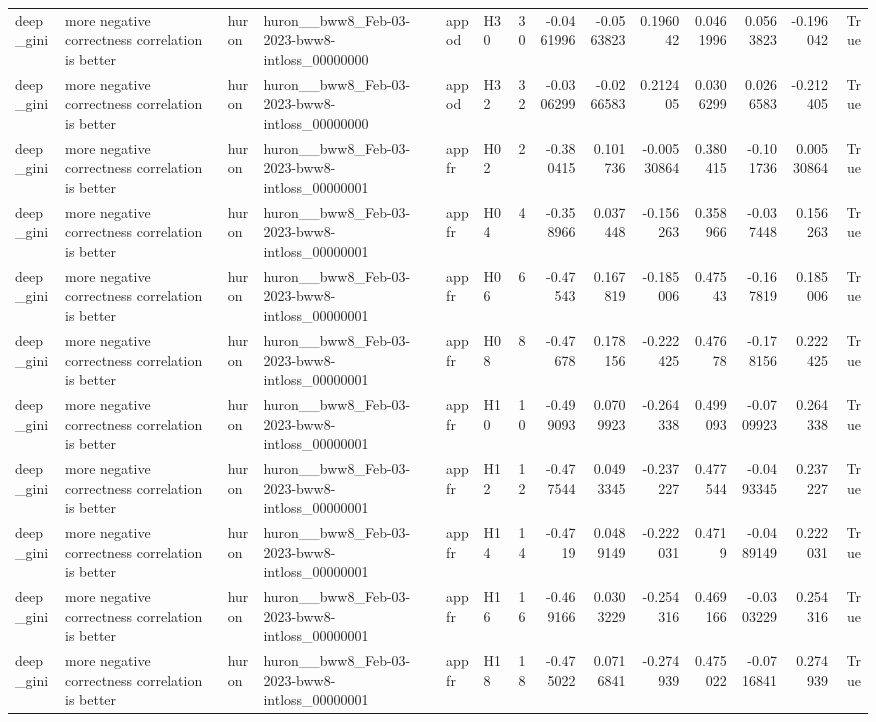 \begin{longtable}{llllllrrrrrrrr}
deep\_gini & more negative correctness correlation is better & huron & huron\_\_bww8\_Feb-03-2023-bww8-intloss\_00000000 & appod & H30 & 30 & -0.0461996 & -0.0563823 & 0.196042 & 0.0461996 & 0.0563823 & -0.196042 & True \\
deep\_gini & more negative correctness correlation is better & huron & huron\_\_bww8\_Feb-03-2023-bww8-intloss\_00000000 & appod & H32 & 32 & -0.0306299 & -0.0266583 & 0.212405 & 0.0306299 & 0.0266583 & -0.212405 & True \\
deep\_gini & more negative correctness correlation is better & huron & huron\_\_bww8\_Feb-03-2023-bww8-intloss\_00000001 & appfr & H02 & 2 & -0.380415 & 0.101736 & -0.00530864 & 0.380415 & -0.101736 & 0.00530864 & True \\
deep\_gini & more negative correctness correlation is better & huron & huron\_\_bww8\_Feb-03-2023-bww8-intloss\_00000001 & appfr & H04 & 4 & -0.358966 & 0.037448 & -0.156263 & 0.358966 & -0.037448 & 0.156263 & True \\
deep\_gini & more negative correctness correlation is better & huron & huron\_\_bww8\_Feb-03-2023-bww8-intloss\_00000001 & appfr & H06 & 6 & -0.47543 & 0.167819 & -0.185006 & 0.47543 & -0.167819 & 0.185006 & True \\
deep\_gini & more negative correctness correlation is better & huron & huron\_\_bww8\_Feb-03-2023-bww8-intloss\_00000001 & appfr & H08 & 8 & -0.47678 & 0.178156 & -0.222425 & 0.47678 & -0.178156 & 0.222425 & True \\
deep\_gini & more negative correctness correlation is better & huron & huron\_\_bww8\_Feb-03-2023-bww8-intloss\_00000001 & appfr & H10 & 10 & -0.499093 & 0.0709923 & -0.264338 & 0.499093 & -0.0709923 & 0.264338 & True \\
deep\_gini & more negative correctness correlation is better & huron & huron\_\_bww8\_Feb-03-2023-bww8-intloss\_00000001 & appfr & H12 & 12 & -0.477544 & 0.0493345 & -0.237227 & 0.477544 & -0.0493345 & 0.237227 & True \\
deep\_gini & more negative correctness correlation is better & huron & huron\_\_bww8\_Feb-03-2023-bww8-intloss\_00000001 & appfr & H14 & 14 & -0.4719 & 0.0489149 & -0.222031 & 0.4719 & -0.0489149 & 0.222031 & True \\
deep\_gini & more negative correctness correlation is better & huron & huron\_\_bww8\_Feb-03-2023-bww8-intloss\_00000001 & appfr & H16 & 16 & -0.469166 & 0.0303229 & -0.254316 & 0.469166 & -0.0303229 & 0.254316 & True \\
deep\_gini & more negative correctness correlation is better & huron & huron\_\_bww8\_Feb-03-2023-bww8-intloss\_00000001 & appfr & H18 & 18 & -0.475022 & 0.0716841 & -0.274939 & 0.475022 & -0.0716841 & 0.274939 & True \\

\end{longtable}
